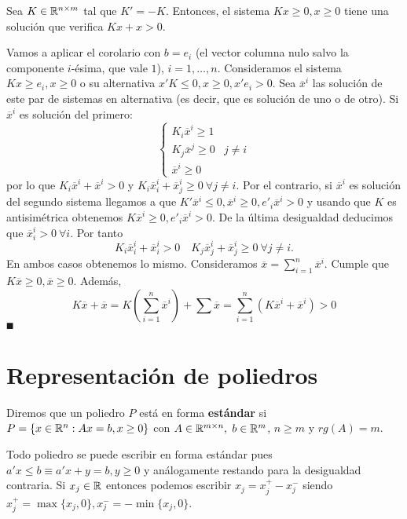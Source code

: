 \documentclass[PM.tex]{subfiles}
\begin{document}
\begin{lema}
Sea $K\in\mathbb{R}^{n\times m}$ tal que $K'=-K$. Entonces, el sistema $Kx\geq 0, x\geq 0$ tiene una solución que verifica $Kx+x>0$.
\end{lema}
\begin{dem}
Vamos a aplicar el corolario con $b=e_i$ (el vector columna nulo salvo la componente $i$-ésima, que vale $1$), $i=1,\dots, n$.
Consideramos el sistema $Kx\geq e_i, x\geq 0$ o su alternativa $x'K\leq 0, x\geq 0, x'e_i>0$. Sea $\overline{x}^i$ las solución de este par de sistemas en alternativa (es decir, que es solución de uno o de otro). Si $\overline{x}^i$ es solución del primero:
\[
\begin{cases}
K_i\overline{x}^i\geq 1 & \\
K_j\overline{x}^j\geq 0 & j\neq i\\
\overline{x}^i\geq 0 &
\end{cases}
\]
por lo que $K_i\overline{x}^i+\overline{x}^i>0$ y $ K_i\overline{x}^i_i + \overline{x}^i_j\geq 0\ \forall j\neq i$. Por el contrario, si $\overline{x}^i $ es solución del segundo sistema llegamos a que $K'\overline{x}^i\leq 0, \overline{x}^i\geq 0, e'_i\overline{x}^i>0$ y usando que $K$ es antisimétrica obtenemos $K\overline{x}^i\geq 0, e'_i\overline{x}^i>0$. De la última desigualdad deducimos que $\overline{x}^i_i> 0\ \forall i$. Por tanto
\[
K_i\overline{x}^i_i +\overline{x}^i_i>0\quad K_j\overline{x}^i_j +\overline{x}^i_j\geq 0\ \forall j\neq i.
\]
En ambos casos obtenemos lo mismo. Consideramos $\overline{x}=\sum_{i=1}^n\overline{x}^i$. Cumple que $K\overline{x}\geq 0, \overline{x}\geq 0$. Además, 
\[
K\overline{x}+\overline{x}=K(\sum_{i=1}^n\overline{x}^i)+\sum\overline{x}=\sum_{i=1}^n(K\overline{x}^i+\overline{x}^i)>0
\]
$\QED$
\end{dem}
\newpage
\section{Representación de poliedros}

\begin{defi}
Diremos que un poliedro $P$ está en forma \textbf{estándar} si $P=\{x\in\mathbb{R}^n: Ax=b,x\geq 0\}$ con $A\in\mathbb{R}^{m\times n},$ $b\in\mathbb{R}^m$, $n\geq m$ y $rg(A)=m$.
\end{defi} 
\begin{nota}
Todo poliedro se puede escribir en forma estándar pues $a'x\leq b\equiv a'x+y=b, y\geq 0$ y análogamente restando para la desigualdad contraria.
Si $x_j\in\mathbb{R}$ entonces podemos escribir $x_j=x_j^+ -x_j^-$ siendo $x_j^+=\max{\{x_j,0\}}, x_j^-=-\min{\{x_j,0\}}$.
\end{nota}
\end{document}
